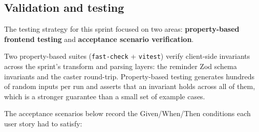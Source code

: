 



\subsection{Validation and testing}

The testing strategy for this sprint focused on two areas: \textbf{property-based frontend
testing} and \textbf{acceptance scenario verification}.

Two property-based suites (\texttt{fast-check} + \texttt{vitest}) verify client-side invariants
across the sprint's transform and parsing layers: the reminder Zod schema invariants and the
caster round-trip. Property-based testing generates hundreds of random inputs per run and
asserts that an invariant holds across all of them, which is a stronger guarantee than a small
set of example cases.

The acceptance scenarios below record the Given/When/Then conditions each user story had to
satisfy:

